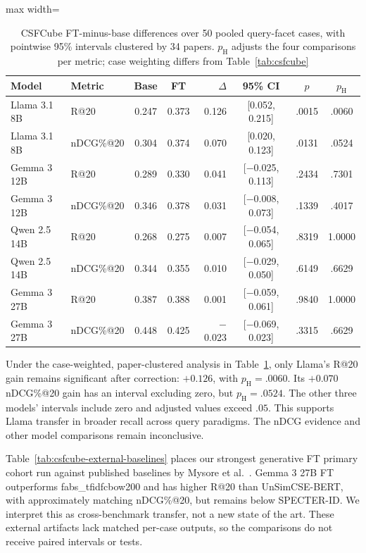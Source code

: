 \documentclass[pdflatex,sn-basic,Numbered]{sn-jnl}%
\theoremstyle{thmstyleone}%
\theoremstyle{thmstyletwo}%
\theoremstyle{thmstylethree}%
\begin{document}
\begin{table}[t]


\centering
\scriptsize
\setlength{\tabcolsep}{4pt}
\renewcommand{\arraystretch}{1.0}
\begin{adjustbox}{max width=\linewidth}
\begin{tabular}{l l c c r c c c}
\hline
Model & Metric & Base & FT & $\Delta$ & 95\% CI & $p$ & $p_{\mathrm{H}}$ \\
\hline
Llama 3.1 8B & R@20 & 0.247 & 0.373 & 0.126 & [0.052, 0.215] & .0015 & .0060 \\
Llama 3.1 8B & nDCG\%@20 & 0.304 & 0.374 & 0.070 & [0.020, 0.123] & .0131 & .0524 \\
Gemma 3 12B & R@20 & 0.289 & 0.330 & 0.041 & [$-$0.025, 0.113] & .2434 & .7301 \\
Gemma 3 12B & nDCG\%@20 & 0.346 & 0.378 & 0.031 & [$-$0.008, 0.073] & .1339 & .4017 \\
Qwen 2.5 14B & R@20 & 0.268 & 0.275 & 0.007 & [$-$0.054, 0.065] & .8319 & 1.0000 \\
Qwen 2.5 14B & nDCG\%@20 & 0.344 & 0.355 & 0.010 & [$-$0.029, 0.050] & .6149 & .6629 \\
Gemma 3 27B & R@20 & 0.387 & 0.388 & 0.001 & [$-$0.059, 0.061] & .9840 & 1.0000 \\
Gemma 3 27B & nDCG\%@20 & 0.448 & 0.425 & $-$0.023 & [$-$0.069, 0.023] & .3315 & .6629 \\
\hline
\end{tabular}
\end{adjustbox}


\caption{CSFCube FT-minus-base differences over 50 pooled query-facet cases, with pointwise 95\% intervals clustered by 34 papers. $p_{\mathrm{H}}$ adjusts the four comparisons per metric; case weighting differs from Table~\ref{tab:csfcube}}
\label{tab:csfcube-uncertainty}
\end{table}

Under the case-weighted, paper-clustered analysis in
Table~\ref{tab:csfcube-uncertainty}, only Llama's R@20 gain remains significant
after correction: $+0.126$, with $p_{\mathrm{H}}=.0060$. Its $+0.070$
nDCG\%@20 gain has an interval excluding zero, but $p_{\mathrm{H}}=.0524$.
The other three models' intervals include zero and adjusted values exceed
$.05$. This supports Llama transfer in broader recall across query paradigms.
The nDCG evidence and other model comparisons remain inconclusive.

Table~\ref{tab:csfcube-external-baselines} places our strongest generative FT primary cohort run
against published baselines by Mysore et al.~\cite{Mysore}. Gemma 3 27B FT outperforms fabs\_tfidfcbow200 and
has higher R@20 than UnSimCSE-BERT, with approximately matching nDCG\%@20,
but remains below SPECTER-ID. We interpret this as cross-benchmark transfer,
not a new state of the art. These external artifacts lack matched per-case
outputs, so the comparisons do not receive paired intervals or tests.
\end{document}
